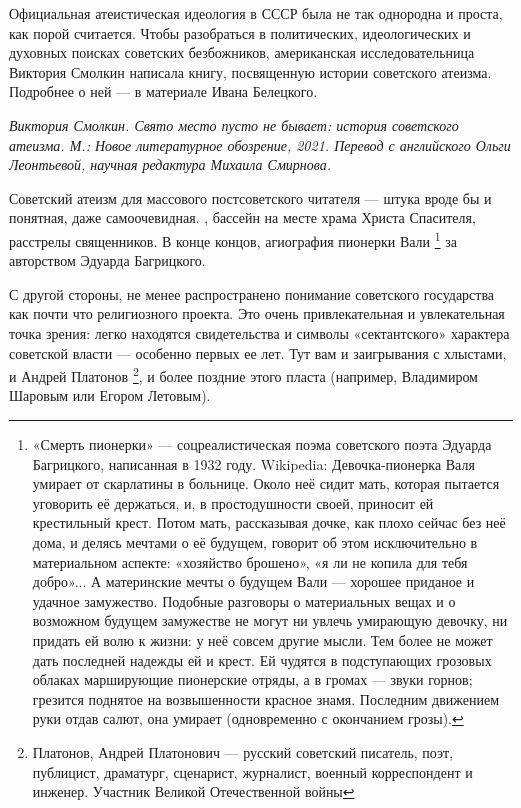 \begin{fancyquotes}
    Официальная атеистическая идеология в СССР была не так однородна и проста,
    как порой считается. Чтобы разобраться в политических, идеологических и
    духовных поисках советских безбожников, американская исследовательница
    Виктория Смолкин написала книгу, посвященную истории советского атеизма.
    Подробнее о ней --- в материале Ивана Белецкого. \\

    \begin{flushright}
        \textit{Виктория Смолкин.
            Свято место пусто не бывает: история советского атеизма.
            М.: Новое литературное обозрение, 2021.
            Перевод с английского Ольги Леонтьевой,
            научная редактура Михаила Смирнова.}
    \end{flushright}
\end{fancyquotes}

Советский атеизм для массового постсоветского читателя ---
штука вроде бы и понятная, даже самоочевидная.
,
бассейн на месте храма Христа Спасителя, расстрелы священников.
В конце концов, агиография пионерки Вали%
\footnote{«Смерть пионерки» --- соцреалистическая поэма советского поэта Эдуарда Багрицкого, написанная в 1932 году.
    Wikipedia: Девочка-пионерка Валя умирает от скарлатины в больнице.
    Около неё сидит мать, которая пытается уговорить её держаться,
    и, в простодушности своей, приносит ей крестильный крест.
    Потом мать, рассказывая дочке, как плохо сейчас без неё дома,
    и делясь мечтами о её будущем, говорит об этом исключительно
    в материальном аспекте: «хозяйство брошено»,
    «я ли не копила для тебя добро»...
    А материнские мечты о будущем Вали --- хорошее приданое и удачное замужество.
    Подобные разговоры о материальных вещах и о возможном будущем замужестве
    не могут ни увлечь умирающую девочку, ни придать ей волю к жизни:
    у неё совсем другие мысли. Тем более не может дать последней надежды
    ей и крест. Ей чудятся в подступающих грозовых облаках марширующие
    пионерские отряды, а в громах — звуки горнов;
    грезится поднятое на возвышенности красное знамя.
    Последним движением руки отдав салют, она умирает (одновременно с окончанием грозы).}
за авторством Эдуарда Багрицкого.

С другой стороны, не менее распространено понимание советского государства
как почти что религиозного проекта.
Это очень привлекательная и увлекательная точка зрения:
легко находятся свидетельства и символы «сектантского» характера
советской власти --- особенно первых ее лет.
Тут вам и заигрывания с хлыстами, и Андрей Платонов%
\footnote{Платонов, Андрей Платонович --- русский советский писатель, поэт,
    публицист, драматург, сценарист, журналист, военный корреспондент и инженер.
    Участник Великой Отечественной войны },
и более поздние 
этого пласта (например, Владимиром Шаровым или Егором Летовым).

